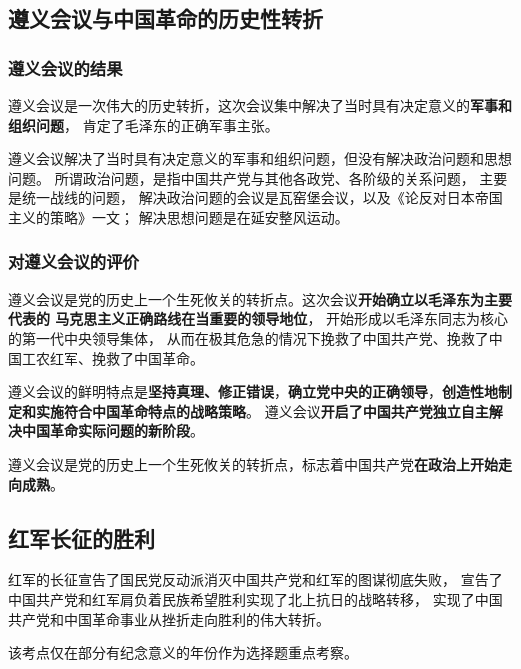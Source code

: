 \documentclass[10pt, UTF8]{book} %
\begin{document}
\subsection{遵义会议与中国革命的历史性转折}

\subsubsection{遵义会议的结果}

遵义会议是一次伟大的历史转折，这次会议集中解决了当时具有决定意义的\textbf{军事和组织问题}，
肯定了毛泽东的正确军事主张。
\begin{remark}
    遵义会议解决了当时具有决定意义的军事和组织问题，但没有解决政治问题和思想问题。
    所谓政治问题，是指中国共产党与其他各政党、各阶级的关系问题，
    主要是统一战线的问题，
    解决政治问题的会议是瓦窑堡会议，以及《论反对日本帝国主义的策略》一文；
    解决思想问题是在延安整风运动。
\end{remark}



\subsubsection{对遵义会议的评价}

遵义会议是党的历史上一个生死攸关的转折点。这次会议\textbf{开始确立以毛泽东为主要代表的
马克思主义正确路线在当重要的领导地位}，
开始形成以毛泽东同志为核心的第一代中央领导集体，
从而在极其危急的情况下挽救了中国共产党、挽救了中国工农红军、挽救了中国革命。

遵义会议的鲜明特点是\textbf{坚持真理、修正错误}，\textbf{确立党中央的正确领导}，\textbf{创造性地制定和实施符合中国革命特点的战略策略}。
遵义会议\textbf{开启了中国共产党独立自主解决中国革命实际问题的新阶段}。

遵义会议是党的历史上一个生死攸关的转折点，标志着中国共产党\textbf{在政治上开始走向成熟}。

\subsection{红军长征的胜利}

红军的长征宣告了国民党反动派消灭中国共产党和红军的图谋彻底失败，
宣告了中国共产党和红军肩负着民族希望胜利实现了北上抗日的战略转移，
实现了中国共产党和中国革命事业从挫折走向胜利的伟大转折。
\begin{remark}
    该考点仅在部分有纪念意义的年份作为选择题重点考察。
\end{remark}
\end{document}
